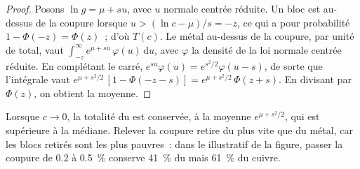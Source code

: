 \begin{proof}
Posons $\ln g = \mu + s u$, avec $u$ normale centrée réduite. Un bloc est au-dessus de la coupure lorsque $u > (\ln c -
\mu)/s = -z$, ce qui a pour probabilité $1 - \Phi(-z) = \Phi(z)$~; d'où $T(c)$. Le métal au-dessus de la coupure, par unité de  total, vaut
$\int_{-z}^{\infty} e^{\mu + s u}\,\varphi(u)\,\mathrm{d}u$, avec $\varphi$ la densité de la loi normale centrée réduite. En complétant le carré,
$e^{su}\varphi(u) =
e^{s^2/2}\varphi(u - s)$, de sorte que l'intégrale vaut $e^{\mu + s^2/2}\,[1 - \Phi(-z - s)] = e^{\mu +
s^2/2}\,\Phi(z + s)$. En divisant par $\Phi(z)$, on obtient la  moyenne.
\end{proof}

Lorsque $c \to 0$, la totalité du  est conservée, à la  moyenne $e^{\mu + s^2/2}$, qui
est supérieure à la médiane. Relever la coupure retire du  plus vite que du métal, car les blocs
retirés sont les plus pauvres~: dans le  illustratif de la figure, passer la coupure de
0.2 à \qty{0.5}{\percent} conserve \qty{41}{\percent} du  mais \qty{61}{\percent} du cuivre.

